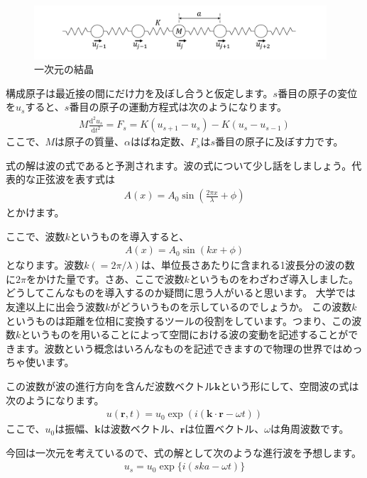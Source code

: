 \documentclass[10pt,b5paper,papersize,dvipdfmx]{jsbook}
\begin{document}
\begin{figure}[htbp]
  \centering
  \includegraphics[height=2cm]{img/bane.pdf}  %
  \caption{一次元の結晶}
  \label{fig:bane}
\end{figure}
構成原子は最近接の間にだけ力を及ぼし合うと仮定します。$s$番目の原子の変位を$u_s$すると、$s$番目の原子の運動方程式は次のようになります。
\begin{align}
  M\frac{\mathrm{d}^2u_s}{\mathrm{d}t^2} = F_s = K (u_{s+1} - u_s) - K (u_s - u_{s-1})
  \label{eq:satom}
\end{align}
ここで、$M$は原子の質量、$\alpha$はばね定数、$F_s$は$s$番目の原子に及ぼす力です。\par
式の解は波の式であると予測されます。波の式について少し話をしましょう。代表的な正弦波を表す式は
\begin{align}
  A(x) = A_0 \sin \left(\frac{2\pi x}{\lambda} + \phi \right)
\end{align}
とかけます。\par
ここで、波数$k$というものを導入すると、
\begin{align}
  A(x) = A_0 \sin (kx + \phi)
\end{align}
となります。波数$k (= 2\pi/\lambda)$は、単位長さあたりに含まれる1波長分の波の数に$2\pi$をかけた量です。さあ、ここで波数$k$というものをわざわざ導入しました。どうしてこんなものを導入するのか疑問に思う人がいると思います。
大学では友達以上に出会う波数$k$がどういうものを示しているのでしょうか。
この波数$k$というものは距離を位相に変換するツールの役割をしています。つまり、この波数$k$というものを用いることによって空間における波の変動を記述することができます。波数という概念はいろんなものを記述できますので物理の世界ではめっちゃ使います。\par
この波数が波の進行方向を含んだ波数ベクトル$\bm{k}$という形にして、空間波の式は次のようになります。
\begin{align}
  u(\bm{r},t) = u_0 \exp(i(\bm{k} \cdot \bm{r} - \omega t))
\end{align}
ここで、$u_0$は振幅、$\bm{k}$は波数ベクトル、$\bm{r}$は位置ベクトル、$\omega$は角周波数です。\par
今回は一次元を考えているので、式の解として次のような進行波を予想します。
\begin{align}
  u_s = u_0 \exp\{i(ska - \omega t)\}
\end{align}
\end{document}

